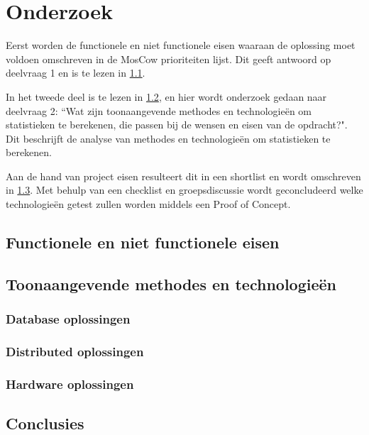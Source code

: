 \chapter{Onderzoek}
\label{ch:onderzoek}

Eerst worden de functionele en niet functionele eisen waaraan de oplossing moet voldoen omschreven in de MosCow prioriteiten lijst. Dit geeft antwoord op deelvraag 1 en is te lezen in \ref{sec:deelvraag1}.

In het tweede deel is te lezen in \ref{sec:deelvraag2}, en hier wordt onderzoek gedaan naar deelvraag 2: ``Wat zijn toonaangevende methodes en technologieën om statistieken te berekenen, die passen bij de wensen en eisen van de opdracht?". Dit beschrijft de analyse van methodes en technologieën om statistieken te berekenen.

Aan de hand van project eisen resulteert dit in een shortlist en wordt omschreven in \ref{sec:gevonden_tools}. Met behulp van een checklist en groepsdiscussie wordt geconcludeerd welke technologieën getest zullen worden middels een Proof of Concept.

\clearpage

\section{Functionele en niet functionele eisen}
\label{sec:deelvraag1}


\clearpage

\section{Toonaangevende methodes en technologieën}
\label{sec:deelvraag2}


\newpage

\subsection{Database oplossingen}
\label{sec:databases}

\clearpage

\subsection{Distributed oplossingen}
\label{sec:distributed}

\clearpage

\subsection{Hardware oplossingen}
\label{sec:hardware}

\clearpage

\section{Conclusies}
\label{sec:gevonden_tools}

